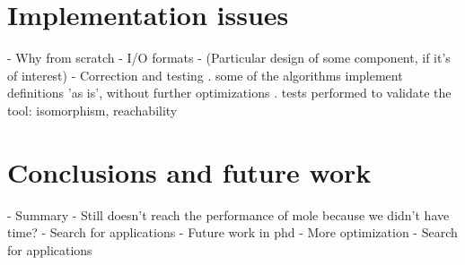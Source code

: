 \documentclass[11pt,a4paper]{article}
\newcommand{\peupdate}{\mbox{\sf pe\_update}}
\begin{document}




\section{Implementation issues}

 - Why from scratch
 - I/O formats
 - (Particular design of some component, if it's of interest)
 - Correction and testing
	. some of the algorithms implement definitions 'as is', without further
	optimizations
	. tests performed to validate the tool: isomorphism, reachability

\section{Conclusions and future work}

 - Summary
 - Still doesn't reach the performance of mole because we didn't have time?
 - Search for applications
 - Future work in phd
 	- More optimization
 - Search for applications
\end{document}
